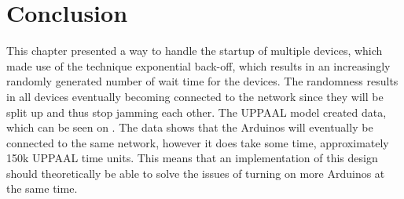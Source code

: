 
\section{Conclusion}
This chapter presented a way to handle the startup of multiple devices, which made use of the technique exponential back-off, which results in an increasingly randomly generated number of wait time for the devices. 
The randomness results in all devices eventually becoming connected to the network since they will be split up and thus stop jamming each other.
The UPPAAL model created data, which can be seen on .
The data shows that the Arduinos will eventually be connected to the same network, however it does take some time, approximately 150k UPPAAL time units.
This means that an implementation of this design should theoretically be able to solve the issues of turning on more Arduinos at the same time.
